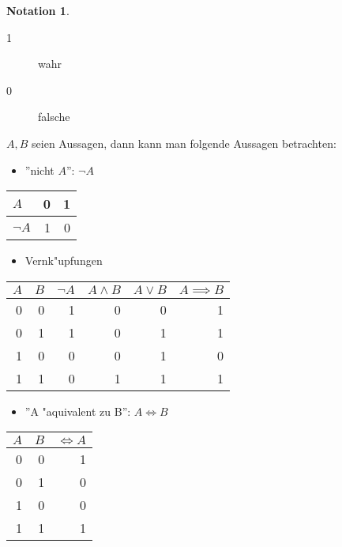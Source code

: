 \documentclass[11pt]{article}
\theoremstyle{remark}
\theoremstyle{definition}
\newtheorem*{notation}{Notation}
\theoremstyle{remark}
\begin{document}
\begin{notation}\
\begin{description}
\item[{1}] wahr
\item[{0}] falsche
\end{description}
\end{notation}

\(A,B\) seien Aussagen, dann kann man folgende Aussagen betrachten:
\begin{relation}
\begin{itemize}
\item ''nicht \(A\)'': \(\neg A\)
\end{itemize}
\begin{center}
\begin{tabular}{lrr}
\(A\) & 0 & 1\\
\hline
\(\neg A\) & 1 & 0\\
\end{tabular}
\end{center}

\begin{itemize}
\item Vernk"upfungen
\end{itemize}
\begin{center}
\begin{tabular}{rrrrrr}
\(A\) & \(B\) & \(\neg A\) & \(A\wedge B\) & \(A \vee B\) & \(A\implies B\)\\
\hline
0 & 0 & 1 & 0 & 0 & 1\\
0 & 1 & 1 & 0 & 1 & 1\\
1 & 0 & 0 & 0 & 1 & 0\\
1 & 1 & 0 & 1 & 1 & 1\\
\end{tabular}
\end{center}

\begin{itemize}
\item ''A "aquivalent zu B'':  \(A\iff B\)
\end{itemize}
\begin{center}
\begin{tabular}{rrr}
\(A\) & \(B\) & \(\iff A\)\\
\hline
0 & 0 & 1\\
0 & 1 & 0\\
1 & 0 & 0\\
1 & 1 & 1\\
\end{tabular}
\end{center}
\end{relation}
\end{document}

